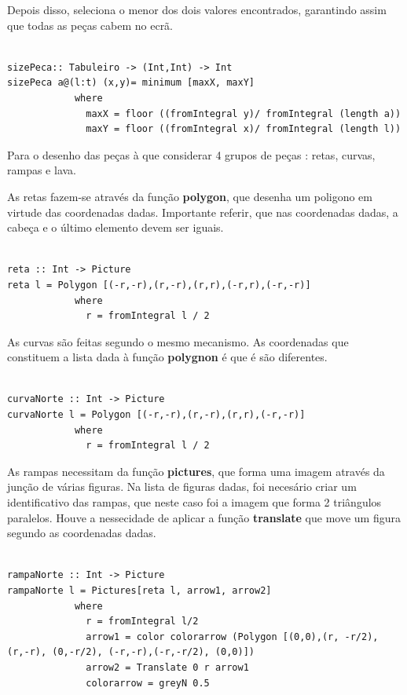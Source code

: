 \documentclass[a4paper]{report} %
\begin{document}
Depois disso, seleciona o menor dos dois valores encontrados, garantindo assim que todas as peças cabem no ecrã.

\begin{verbatim}

sizePeca:: Tabuleiro -> (Int,Int) -> Int
sizePeca a@(l:t) (x,y)= minimum [maxX, maxY]
            where
              maxX = floor ((fromIntegral y)/ fromIntegral (length a))  
              maxY = floor ((fromIntegral x)/ fromIntegral (length l))

\end{verbatim}

\newpage

Para o desenho das peças à que considerar 4 grupos de peças : retas, curvas, rampas e lava.

As retas fazem-se através da função \textbf{polygon}, que desenha um poligono em virtude das coordenadas dadas. Importante referir, que nas coordenadas dadas, a cabeça e o último elemento devem ser iguais.

\begin{verbatim}

reta :: Int -> Picture
reta l = Polygon [(-r,-r),(r,-r),(r,r),(-r,r),(-r,-r)]
            where
              r = fromIntegral l / 2

\end{verbatim}

As curvas são feitas segundo o mesmo mecanismo. As coordenadas que constituem a lista dada à função \textbf{polygnon} é que é são diferentes.

\scriptsize

\begin{verbatim}
               
curvaNorte :: Int -> Picture
curvaNorte l = Polygon [(-r,-r),(r,-r),(r,r),(-r,-r)]
            where
              r = fromIntegral l / 2
\end{verbatim}

\normalsize

As rampas necessitam da função \textbf{pictures}, que forma uma imagem através da junção de várias figuras. Na lista de figuras dadas, foi necesário criar um identificativo das rampas, que neste caso foi a imagem que forma 2 triângulos paralelos. Houve a nessecidade de aplicar a função \textbf{translate} que move um figura segundo as coordenadas dadas.

\scriptsize

\begin{verbatim}

rampaNorte :: Int -> Picture
rampaNorte l = Pictures[reta l, arrow1, arrow2]
            where
              r = fromIntegral l/2
              arrow1 = color colorarrow (Polygon [(0,0),(r, -r/2), (r,-r), (0,-r/2), (-r,-r),(-r,-r/2), (0,0)])
              arrow2 = Translate 0 r arrow1
              colorarrow = greyN 0.5

\end{verbatim}
\end{document}
